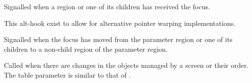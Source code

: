 \begin{function}
    \begin{funcdesc}
      Signalled when a region or one of its children has received the focus.
    \end{funcdesc}
\end{function}


\begin{function}
    \begin{funcdesc}
      This alt-hook exist to allow for alternative pointer warping
      implementations.
    \end{funcdesc}
\end{function}


\begin{function}
    \begin{funcdesc}
      Signalled when the focus has moved from the parameter region or
      one of its children to a non-child region of the parameter region.
    \end{funcdesc}
\end{function}


\begin{function}
    \begin{funcdesc}
      Called when there are changes in the objects managed by a screen
      or their order. The table parameter is similar to that of
      .
    \end{funcdesc}
\end{function}
